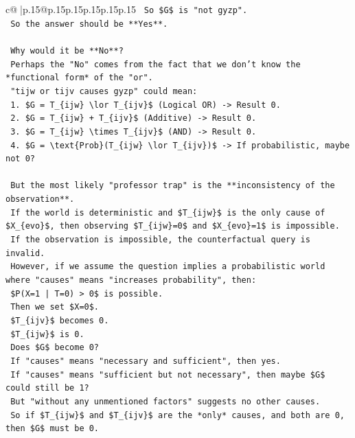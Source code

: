 \documentclass{article}
\begin{document}
{\begin{supertabular}{c@{$\;$}|p{.15\linewidth}@{}p{.15\linewidth}p{.15\linewidth}p{.15\linewidth}p{.15\linewidth}p{.15\linewidth}}
{{{\texttt{    So \$G\$ is "not gyzp".} \\
\texttt{    So the answer should be **Yes**.} \\
\\ 
\texttt{    Why would it be **No**?} \\
\texttt{    Perhaps the "No" comes from the fact that we don't know the *functional form* of the "or".} \\
\texttt{    "tijw or tijv causes gyzp" could mean:} \\
\texttt{    1. \$G = T\_\{ijw\} \textbackslash{}lor T\_\{ijv\}\$ (Logical OR) {-}> Result 0.} \\
\texttt{    2. \$G = T\_\{ijw\} + T\_\{ijv\}\$ (Additive) {-}> Result 0.} \\
\texttt{    3. \$G = T\_\{ijw\} \textbackslash{}times T\_\{ijv\}\$ (AND) {-}> Result 0.} \\
\texttt{    4. \$G = \textbackslash{}text\{Prob\}(T\_\{ijw\} \textbackslash{}lor T\_\{ijv\})\$ {-}> If probabilistic, maybe not 0?} \\
\\ 
\texttt{    But the most likely "professor trap" is the **inconsistency of the observation**.} \\
\texttt{    If the world is deterministic and \$T\_\{ijw\}\$ is the only cause of \$X\_\{evo\}\$, then observing \$T\_\{ijw\}=0\$ and \$X\_\{evo\}=1\$ is impossible.} \\
\texttt{    If the observation is impossible, the counterfactual query is invalid.} \\
\texttt{    However, if we assume the question implies a probabilistic world where "causes" means "increases probability", then:} \\
\texttt{    \$P(X=1 | T=0) > 0\$ is possible.} \\
\texttt{    Then we set \$X=0\$.} \\
\texttt{    \$T\_\{ijv\}\$ becomes 0.} \\
\texttt{    \$T\_\{ijw\}\$ is 0.} \\
\texttt{    Does \$G\$ become 0?} \\
\texttt{    If "causes" means "necessary and sufficient", then yes.} \\
\texttt{    If "causes" means "sufficient but not necessary", then maybe \$G\$ could still be 1?} \\
\texttt{    But "without any unmentioned factors" suggests no other causes.} \\
\texttt{    So if \$T\_\{ijw\}\$ and \$T\_\{ijv\}\$ are the *only* causes, and both are 0, then \$G\$ must be 0.} \\
}}}
\end{supertabular}}
\end{document}
